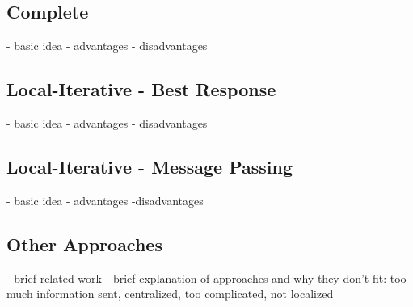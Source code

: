 \subsection{Complete}

    - basic idea
    - advantages
    - disadvantages

\subsection{Local-Iterative - Best Response}

    - basic idea
    - advantages
    - disadvantages

\subsection{Local-Iterative - Message Passing}

    - basic idea
    - advantages
    -disadvantages

\subsection{Other Approaches}

    - brief related work
    - brief explanation of approaches and why they don't fit: too much information sent, centralized, too complicated, not localized